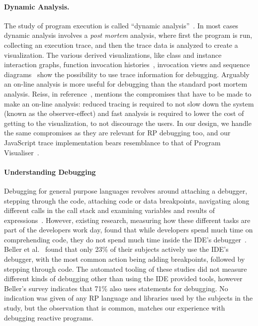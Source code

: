 \paragraph{Dynamic Analysis.} The study of program execution is called
``dynamic analysis''~\cite{cornelissen2009systematic}.  In most cases
dynamic analysis involves a \textit{post mortem} analysis, where first
the program is run, collecting an execution trace, and then the trace
data is analyzed to create a visualization.  The various derived
visualizations, like class and instance interaction graphs, function
invocation histories~\cite{lange1995program}, invocation views and
sequence diagrams~\cite{cornelissen2008execution} show the possibility
to use trace information for debugging.  Arguably an on-line analysis is
more useful for debugging than the standard post mortem analysis. Reiss,
in reference~\cite{reiss2006visualizing}, mentions the compromises that
have to be made to make an on-line analysis:  reduced tracing is
required to not slow down the system (known as the observer-effect) and
fast analysis is required to lower the cost of getting to the
visualization, to not discourage the users.  In our design, we handle
the same compromises as they are relevant for RP debugging too, and our
JavaScript trace implementation bears resemblance to that of Program
Visualiser~\cite{lange1995program}.

\paragraph{Understanding Debugging} Debugging for general purpose
languages revolves around attaching a debugger, stepping through the
code, attaching code or data breakpoints, navigating along different
calls in the call stack and examining variables and results of
expressions~\cite{Spinellis2017}.  However, existing research, measuring
how these different tasks are part of the developers work day, found
that while developers spend much time on comprehending code, they do not
spend much time inside the IDE's debugger~\cite{minelli2015know}.
Beller et al.~\cite{beller2017behavior} found that only 23\% of their
subjects actively use the IDE's debugger, with the most common action
being adding breakpoints, followed by stepping through code.  The
automated tooling of these studies did not measure different kinds of
debugging other than using the IDE provided tools, however Beller's
survey indicates that 71\% also uses  statements for
debugging. No indication was given of any RP language and libraries used
by the subjects in the study, but the observation that \printfdebugging{}
is common, matches our experience with debugging reactive programs.

